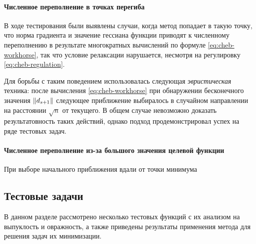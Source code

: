 \paragraph{Численное переполнение в точках перегиба}
В ходе тестирования \relch{} были выявлены случаи, когда метод
попадает в такую точку, что норма градиента и значение гессиана
функции приводят к численному переполнению в результате многократных
вычислений по формуле \eqref{eq:cheb-workhorse}, так что условие
релаксации нарушается, несмотря на регулировку
\eqref{eq:cheb-regulation}.

Для борьбы с таким поведением использовалась следующая
\emph{эвристическая} техника: после вычисления
\eqref{eq:cheb-workhorse} при обнаружении бесконечного значения
$\left \lVert{d_{s+1}}\right \rVert$ следующее приближение выбиралось в случайном
направлении на расстоянии $\sqrt{n}$ от текущего. В общем случае
невозможно доказать результатовность таких действий, однако подход
продемонстрировал успех на ряде тестовых задач.

\paragraph{Численное переполнение из-за большого значения целевой
  функции}

При выборе начального приближения вдали от точки минимума

\clearpage
\subsection{Тестовые задачи}
\label{sec:test-problems}

В данном разделе рассмотрено несколько тестовых функций с их анализом
на выпуклость и овражность, а также приведены результаты применения
метода \relch{} для решения задач их минимизации.





